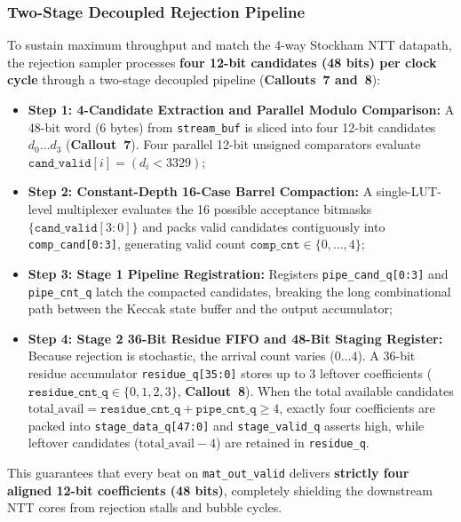 \subsubsection{Two-Stage Decoupled Rejection Pipeline}
To sustain maximum throughput and match the 4-way Stockham NTT datapath, the rejection sampler processes \textbf{four 12-bit candidates (48 bits) per clock cycle} through a two-stage decoupled pipeline (\textbf{Callouts~7 and~8}):
\begin{itemize}
    \item \textbf{Step 1: 4-Candidate Extraction and Parallel Modulo Comparison:} A 48-bit word (6 bytes) from \texttt{stream\_buf} is sliced into four 12-bit candidates $d_0 \dots d_3$ (\textbf{Callout~7}). Four parallel 12-bit unsigned comparators evaluate $\texttt{cand\_valid}[i] = (d_i < 3329)$;
    \item \textbf{Step 2: Constant-Depth 16-Case Barrel Compaction:} A single-LUT-level multiplexer evaluates the 16 possible acceptance bitmasks $\{\texttt{cand\_valid}[3:0]\}$ and packs valid candidates contiguously into \texttt{comp\_cand[0:3]}, generating valid count $\texttt{comp\_cnt} \in \{0, \dots, 4\}$;
    \item \textbf{Step 3: Stage 1 Pipeline Registration:} Registers \texttt{pipe\_cand\_q[0:3]} and \texttt{pipe\_cnt\_q} latch the compacted candidates, breaking the long combinational path between the Keccak state buffer and the output accumulator;
    \item \textbf{Step 4: Stage 2 36-Bit Residue FIFO and 48-Bit Staging Register:} Because rejection is stochastic, the arrival count varies ($0 \dots 4$). A 36-bit residue accumulator \texttt{residue\_q[35:0]} stores up to 3 leftover coefficients ($\texttt{residue\_cnt\_q} \in \{0, 1, 2, 3\}$, \textbf{Callout~8}). When the total available candidates $\text{total\_avail} = \texttt{residue\_cnt\_q} + \texttt{pipe\_cnt\_q} \ge 4$, exactly four coefficients are packed into \texttt{stage\_data\_q[47:0]} and \texttt{stage\_valid\_q} asserts high, while leftover candidates ($\text{total\_avail} - 4$) are retained in \texttt{residue\_q}.
\end{itemize}
This guarantees that every beat on \texttt{mat\_out\_valid} delivers \textbf{strictly four aligned 12-bit coefficients (48 bits)}, completely shielding the downstream NTT cores from rejection stalls and bubble cycles.

